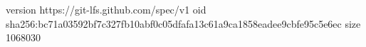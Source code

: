version https://git-lfs.github.com/spec/v1
oid sha256:bc71a03592bf7c327fb10abf0c05dfafa13c61a9ca1858eadee9cbfe95c5e6ec
size 1068030
